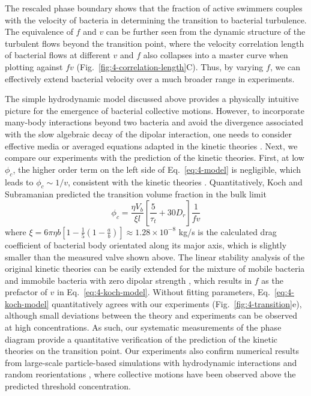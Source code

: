 The rescaled phase boundary shows that the fraction of active swimmers couples with the velocity of bacteria in determining the transition to bacterial turbulence. The equivalence of $f$ and $v$ can be further seen from the dynamic structure of the turbulent flows beyond the transition point, where the velocity correlation length of bacterial flows at different $v$ and $f$ also collapses into a master curve when plotting against $fv$ (Fig.~\ref{fig:4-correlation-length}C). Thus, by varying $f$, we can effectively extend bacterial velocity over a much broader range in experiments.

The simple hydrodynamic model discussed above provides a physically intuitive picture for the emergence of bacterial collective motions. However, to incorporate many-body interactions beyond two bacteria and avoid the divergence associated with the slow algebraic decay of the dipolar interaction, one needs to consider effective media or averaged equations adapted in the kinetic theories \cite{Subramanian2009}. Next, we compare our experiments with the prediction of the kinetic theories. First, at low $\phi_c$, the higher order term on the left side of Eq.~\ref{eq:4-model} is negligible, which leads to $\phi_c \sim 1/v$, consistent with the kinetic theories \cite{Koch2011, Stenhammar2017, Bardfalvy2020}. Quantitatively, Koch and Subramanian predicted the transition volume fraction in the bulk limit \cite{Koch2011}
\begin{equation}
  \label{eq:4-koch-model}
  \phi_c = \frac{\eta V_b}{\xi l}\left[ \frac{5}{\tau_t} + 30D_r \right] \frac{1}{fv}
\end{equation}
where $\xi = 6\pi\eta b \left[ 1-\frac{1}{5}(1-\frac{a}{b}) \right] \approx 1.28 \times 10^{-8}$ kg/s is the calculated drag coefficient of bacterial body
orientated along its major axis, which is slightly smaller than the measured valve shown above. The linear stability analysis of the original kinetic theories can be easily extended for the mixture of mobile bacteria and immobile bacteria with zero dipolar strength \cite{Subramanian2009, Bardfalvy2020}, which results in $f$ as the prefactor of $v$ in Eq.~\ref{eq:4-koch-model}.
Without fitting parameters, Eq.~\ref{eq:4-koch-model} quantitatively agrees with our experiments (Fig.~\ref{fig:4-transition}e), although small deviations between the theory and experiments can be observed at high concentrations. As such, our systematic measurements of the phase diagram provide a quantitative verification of the prediction of the kinetic theories on the transition point.
Our experiments also confirm numerical results from large-scale particle-based simulations with hydrodynamic interactions and random reorientations \cite{Krishnamurthy2015, Bardfalvy2019}, where collective motions have been observed above the predicted threshold concentration.


